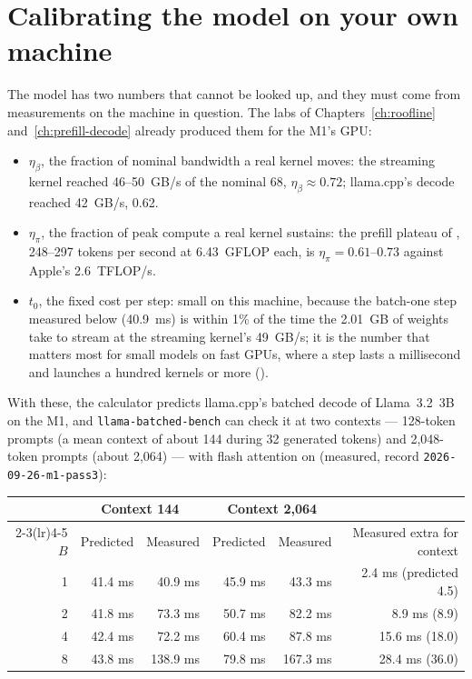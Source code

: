\section{Calibrating the model on your own machine}

The model has two numbers that cannot be looked up, and they must come from
measurements on the machine in question. The labs of Chapters~\ref{ch:roofline}
and~\ref{ch:prefill-decode} already produced them for the M1's GPU:

\begin{itemize}
\item $\eta_\beta$, the fraction of nominal bandwidth a real kernel moves: the
streaming kernel reached 46--50~GB/s of the nominal 68, $\eta_\beta \approx 0.72$;
llama.cpp's decode reached 42~GB/s, 0.62.
\item $\eta_\pi$, the fraction of peak compute a real kernel sustains: the
prefill plateau of , 248--297 tokens per second at
6.43~GFLOP each, is $\eta_\pi = 0.61$--$0.73$ against Apple's 2.6~TFLOP/s.
\item $t_0$, the fixed cost per step: small on this machine, because the
batch-one step measured below (40.9~ms) is within 1\% of the time the 2.01~GB of
weights take to stream at the streaming kernel's 49~GB/s; it is the number that
matters most for small models on fast GPUs, where a step lasts a millisecond and
launches a hundred kernels or more ().
\end{itemize}

\noindent With these, the calculator predicts llama.cpp's batched decode of
Llama~3.2~3B on the M1, and \texttt{llama-batched-bench} can check it at two
contexts --- 128-token prompts (a mean context of about 144 during 32 generated
tokens) and 2,048-token prompts (about 2,064) --- with flash attention on
(measured, record \texttt{2026-09-26-m1-pass3}):

\begin{center}\small
\begin{tabular}{@{}rrrrrr@{}}
\toprule
 & \multicolumn{2}{c}{Context 144} & \multicolumn{2}{c}{Context 2,064} & \\
\cmidrule(lr){2-3}\cmidrule(lr){4-5}
$B$ & Predicted & Measured & Predicted & Measured & Measured extra for context \\
\midrule
1 & 41.4 ms & 40.9 ms & 45.9 ms & 43.3 ms & 2.4 ms (predicted 4.5) \\
2 & 41.8 ms & 73.3 ms & 50.7 ms & 82.2 ms & 8.9 ms (8.9) \\
4 & 42.4 ms & 72.2 ms & 60.4 ms & 87.8 ms & 15.6 ms (18.0) \\
8 & 43.8 ms & 138.9 ms & 79.8 ms & 167.3 ms & 28.4 ms (36.0) \\
\bottomrule
\end{tabular}
\end{center}

